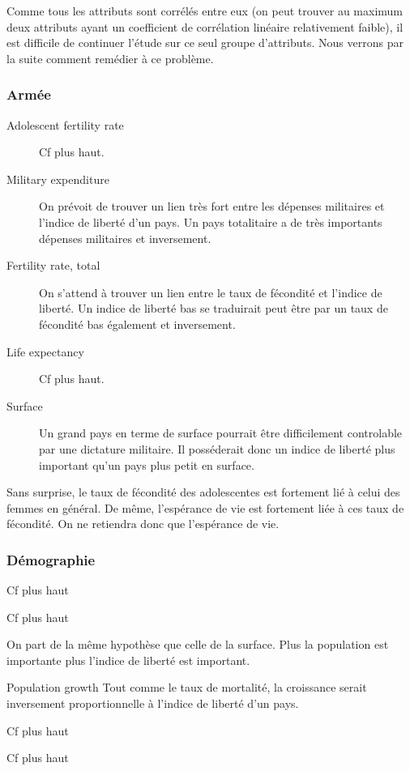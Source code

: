Comme tous les attributs sont corrélés entre eux (on peut trouver au maximum deux attributs ayant un coefficient de corrélation linéaire relativement faible), il est difficile de continuer l'étude sur ce seul groupe d'attributs. Nous verrons par la suite comment remédier à ce problème.

\subsubsection{Armée}
\begin{description}
\item [Adolescent fertility rate]
Cf plus haut.
\item [Military expenditure]
On prévoit de trouver un lien très fort entre les dépenses militaires et l'indice de liberté d'un pays. Un pays totalitaire a de très importants dépenses militaires et inversement.
\item [Fertility rate, total]
On s'attend à trouver un lien entre le taux de fécondité et l'indice de liberté. Un indice de liberté bas se traduirait peut être par un taux de fécondité bas également et inversement.
\item [Life expectancy]
Cf plus haut.
\item [Surface]
Un grand pays en terme de surface pourrait être difficilement controlable par une dictature militaire. Il posséderait donc un indice de liberté plus important qu'un pays plus petit en surface.
\end{description}

Sans surprise, le taux de fécondité des adolescentes est fortement lié à celui des femmes en général. De même, l'espérance de vie est fortement liée à ces taux de fécondité. On ne retiendra donc que l'espérance de vie.

\subsubsection{Démographie} 
\begin{description}
\item [Fertility rate]
Cf plus haut
\item [Adolescent fertility]
Cf plus haut
\item [Population totale]
On part de la même hypothèse que celle de la surface. Plus la population est importante plus l'indice de liberté est important.
\item Population growth
Tout comme le taux de mortalité, la croissance serait inversement proportionnelle à l'indice de liberté d'un pays.
\item [Life expectancy]
Cf plus haut
\item [Surface]
Cf plus haut
\end{description}

